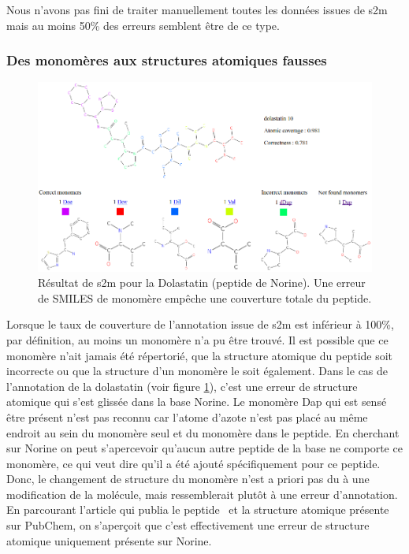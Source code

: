 Nous n'avons pas fini de traiter manuellement toutes les données issues de s2m mais au moins 50\% des erreurs semblent être de ce type.


\subsubsection{Des monomères aux structures atomiques fausses}

\label{dolastatin_p}

\begin{figure}[h!]
  \begin{center}
    \includegraphics[width=450px]{Figures/s2m/results/dolastatin.png}
    \caption{\label{dolas}Résultat de s2m pour la Dolastatin (peptide de Norine).
    Une erreur de SMILES de monomère empêche une couverture totale du peptide.}
  \end{center}
\end{figure}

Lorsque le taux de couverture de l'annotation issue de s2m est inférieur à 100\%, par définition, au moins un monomère n'a pu être trouvé.
Il est possible que ce monomère n'ait jamais été répertorié, que la structure atomique du peptide soit incorrecte ou que la structure d'un monomère le soit également.
Dans le cas de l'annotation de la dolastatin (voir figure \ref{dolas}), c'est une erreur de structure atomique qui s'est glissée dans la base Norine.
Le monomère Dap qui est sensé être présent n'est pas reconnu car l'atome d'azote n'est pas placé au même endroit au sein du monomère seul et du monomère dans le peptide.
En cherchant sur Norine on peut s'apercevoir qu'aucun autre peptide de la base ne comporte ce monomère, ce qui veut dire qu'il a été ajouté spécifiquement pour ce peptide.
Donc, le changement de structure du monomère n'est a priori pas du à une modification de la molécule, mais ressemblerait plutôt à une erreur d'annotation.
En parcourant l'article qui publia le peptide~\cite{luesch_isolation_2001} et la structure atomique présente sur PubChem, on s'aperçoit que c'est effectivement une erreur de structure atomique uniquement présente sur Norine.


